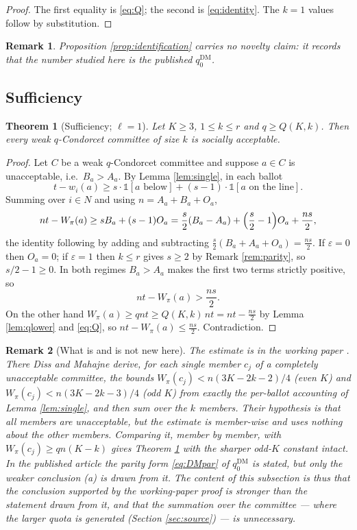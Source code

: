\documentclass[11pt]{article}
\theoremstyle{plain}
\newtheorem{theorem}{Theorem}
\newtheorem{remark}{Remark}
\theoremstyle{definition}
\newcommand{\eps}{\varepsilon}
\newcommand{\DM}{\mathrm{DM}}
\begin{document}
\begin{proof}
The first equality is \eqref{eq:Q}; the second is \eqref{eq:identity}. The $k=1$ values follow by substitution.
\end{proof}

\begin{remark}
Proposition \ref{prop:identification} carries no novelty claim: it records that the number studied here is the published $q_0^{\DM}$.
\end{remark}

\subsection{Sufficiency}

\begin{theorem}[Sufficiency; $\ell=1$]
\label{thm:suff}
Let $K\ge3$, $1\le k\le r$ and $q\ge Q(K,k)$. Then every weak $q$-Condorcet committee of size $k$ is socially acceptable.
\end{theorem}

\begin{proof}
Let $C$ be a weak $q$-Condorcet committee and suppose $a\in C$ is unacceptable, i.e.\ $B_a>A_a$. By Lemma \ref{lem:single}, in each ballot
\[
t-w_i(a)\ge s\cdot\mathbb{1}[a\text{ below}]+(s-1)\cdot\mathbb{1}[a\text{ on the line}].
\]
Summing over $i\in N$ and using $n=A_a+B_a+O_a$,
\[
nt-W_\pi(a)\ge sB_a+(s-1)O_a
=\frac{s}{2}(B_a-A_a)+\Bigl(\frac{s}{2}-1\Bigr)O_a+\frac{ns}{2},
\]
the identity following by adding and subtracting $\frac{s}{2}(B_a+A_a+O_a)=\frac{ns}{2}$. If $\eps=0$ then $O_a=0$; if $\eps=1$ then $k\le r$ gives $s\ge2$ by Remark \ref{rem:parity}, so $s/2-1\ge0$. In both regimes $B_a>A_a$ makes the first two terms strictly positive, so
\[
nt-W_\pi(a)>\frac{ns}{2}.
\]
On the other hand $W_\pi(a)\ge qnt\ge Q(K,k)\,nt=nt-\frac{ns}{2}$ by Lemma \ref{lem:qlower} and \eqref{eq:Q}, so $nt-W_\pi(a)\le\frac{ns}{2}$. Contradiction.
\end{proof}

\begin{remark}[What is and is not new here]
\label{rem:notnew}
The estimate is in the working paper \cite[pp.~8--10]{DissMahajne2019}. There Diss and Mahajne derive, for each single member $c_j$ of a \emph{completely} unacceptable committee, the bounds $W_\pi(c_j)<n(3K-2k-2)/4$ (even $K$) and $W_\pi(c_j)<n(3K-2k-3)/4$ (odd $K$) from exactly the per-ballot accounting of Lemma \ref{lem:single}, and then sum over the $k$ members. Their hypothesis is that all members are unacceptable, but the estimate is member-wise and uses nothing about the other members. Comparing it, member by member, with $W_\pi(c_j)\ge qn(K-k)$ gives Theorem \ref{thm:suff} with the sharper odd-$K$ constant intact. In the published article the parity form \eqref{eq:DMpar} of $q_0^{\DM}$ is stated, but only the weaker conclusion (a) is drawn from it. The content of this subsection is thus that the conclusion supported by the working-paper proof is stronger than the statement drawn from it, and that the summation over the committee --- where the larger quota is generated (Section \ref{sec:source}) --- is unnecessary.
\end{remark}
\end{document}
